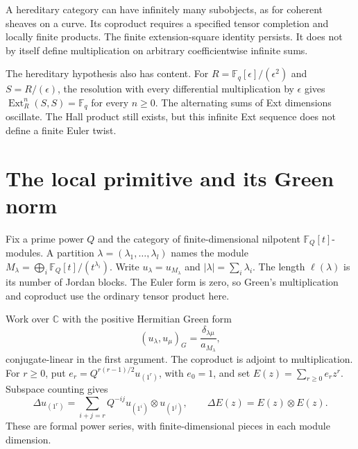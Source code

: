 A hereditary category can have infinitely many subobjects, as for
coherent sheaves on a curve. Its coproduct requires a specified tensor
completion and locally finite products. The finite extension-square
identity persists. It does not by itself define multiplication on
arbitrary coefficientwise infinite sums.

The hereditary hypothesis also has content. For
$R=\mathbb F_q[\epsilon]/(\epsilon^2)$ and $S=R/(\epsilon)$,
the resolution with every differential multiplication by $\epsilon$
gives $\operatorname{Ext}^n_R(S,S)=\mathbb F_q$ for every $n\geq0$.
The alternating sums of Ext dimensions oscillate. The Hall product
still exists, but this infinite Ext sequence does not define a finite
Euler twist.

\section{The local primitive and its Green norm}
\label{v4-arith:hall:sec:primitive}

Fix a prime power $Q$ and the category of finite-dimensional
nilpotent $\mathbb F_Q[t]$-modules. A partition
$\lambda=(\lambda_1,\ldots,\lambda_l)$ names the module
$M_\lambda=\bigoplus_i\mathbb F_Q[t]/(t^{\lambda_i})$.
Write $u_\lambda=u_{M_\lambda}$ and $|\lambda|=\sum_i\lambda_i$.
The length $\ell(\lambda)$ is its number of Jordan blocks.
The Euler form is zero, so Green's multiplication and coproduct
use the ordinary tensor product here.

Work over $\mathbb C$ with the positive Hermitian Green form
\[
 (u_\lambda,u_\mu)_G
 =\frac{\delta_{\lambda\mu}}{a_{M_\lambda}},
\]
conjugate-linear in the first argument. The coproduct is adjoint
to multiplication. For $r\geq0$, put
$e_r=Q^{r(r-1)/2}u_{(1^r)}$, with $e_0=1$, and set
$E(z)=\sum_{r\geq0}e_rz^r$. Subspace counting gives
\[
 \Delta u_{(1^r)}=\sum_{i+j=r}Q^{-ij}u_{(1^i)}\otimes u_{(1^j)},
 \qquad \Delta E(z)=E(z)\otimes E(z).
\]
These are formal power series, with finite-dimensional pieces in
each module dimension.

